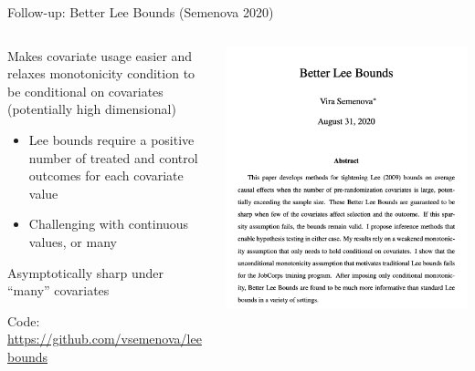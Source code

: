 \documentclass[notes,11pt, aspectratio=169]{beamer}
\newenvironment{wideitemize}{\itemize\addtolength{\itemsep}{10pt}}{\enditemize}
\begin{document}
\begin{frame}{Follow-up: Better Lee Bounds (Semenova 2020)}
      \begin{columns}[onlytextwidth, T] %
        \begin{column}{.5\textwidth}
          \begin{wideitemize}
          \item Makes covariate usage easier and relaxes monotonicity condition to be conditional on
            covariates (potentially high dimensional)
            \begin{itemize}
            \item Lee bounds require a positive number of treated and
              control outcomes for each covariate value
            \item Challenging with continuous values, or many
            \end{itemize}
          \item Asymptotically sharp under ``many'' covariates 
          \item Code: \url{https://github.com/vsemenova/leebounds}
          \end{wideitemize}
      \end{column}%
      \hfill%
      \begin{column}{.5\textwidth}
        \includegraphics[width=\linewidth]{images/semenova_1.png}
      \end{column}%
    \end{columns}
\end{frame}
\end{document}
